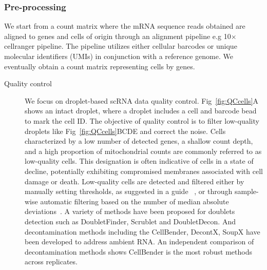 \subsubsection{Pre-processing}
We start from a count matrix where the mRNA sequence reads obtained are aligned to genes and cells of origin through an alignment pipeline e.g 10$\times$ cellranger pipeline. The pipeline utilizes either cellular barcodes or unique molecular identifiers (UMIs) in conjunction with a reference genome. We eventually obtain a count matrix representing cells by genes. 
\begin{description}
	\item[Quality control] 
	We focus on droplet-based scRNA data quality control. Fig~\ref{fig:QCcells}A shows an intact droplet, where a droplet includes a cell and barcode bead to mark the cell ID. The objective of quality control is to filter low-quality droplets like Fig~\ref{fig:QCcells}BCDE and correct the noise. Cells characterized by a low number of detected genes, a shallow count depth, and a high proportion of mitochondrial counts are commonly referred to as low-quality cells. This designation is often indicative of cells in a state of decline, potentially exhibiting compromised membranes associated with cell damage or death. Low-quality cells are detected and filtered either by manually setting thresholds, as suggested in a guide ~\citep{luecken2019current}, or through sample-wise automatic filtering based on the number of median absolute deviations~\citep{germain2020pipecomp}. A variety of methods have been proposed for doublets detection such as DoubletFinder, Scrublet and DoubletDecon\citep{mcginnis2019doubletfinder, wolock2019scrublet, depasquale2019doubletdecon}. And decontamination methods including the CellBender, DecontX, SoupX have been developed to address ambient RNA\citep{fleming2019cellbender,yang2020decontx,young2020soupx}. An independent comparison of decontamination methods shows CellBender is the most robust methods across replicates\citep{janssen2023benchambient}.


\end{description}
